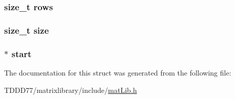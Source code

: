 \subsubsection[{rows}]{\setlength{\rightskip}{0pt plus 5cm}size\+\_\+t rows}\label{structmatrix_ad161320eba27a8b966baac47bee35c46}
\hypertarget{structmatrix_a854352f53b148adc24983a58a1866d66}{}
\subsubsection[{size}]{\setlength{\rightskip}{0pt plus 5cm}size\+\_\+t size}\label{structmatrix_a854352f53b148adc24983a58a1866d66}
\hypertarget{structmatrix_a34f549255e7222691d5c0d1160ea26f1}{}
\subsubsection[{start}]{$\ast$ start}\label{structmatrix_a34f549255e7222691d5c0d1160ea26f1}


The documentation for this struct was generated from the following file\+:\begin{DoxyCompactItemize}
\item 
T\+D\+D\+D77/matrixlibrary/include/\hyperlink{mat_lib_8h}{mat\+Lib.\+h}\end{DoxyCompactItemize}
